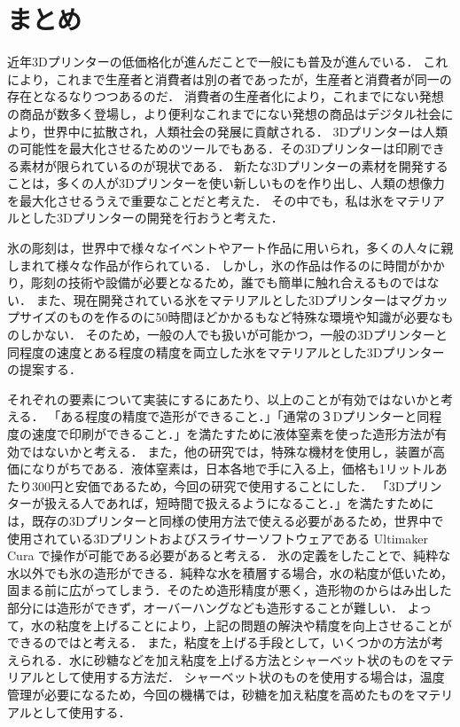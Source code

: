 \chapter{まとめ}
\label{chp:first}

近年3Dプリンターの低価格化が進んだことで一般にも普及が進んでいる．
これにより，これまで生産者と消費者は別の者であったが，生産者と消費者が同一の存在となるなりつつあるのだ．
消費者の生産者化により，これまでにない発想の商品が数多く登場し，より便利なこれまでにない発想の商品はデジタル社会により，世界中に拡散され，人類社会の発展に貢献される．
3Dプリンターは人類の可能性を最大化させるためのツールでもある．その3Dプリンターは印刷できる素材が限られているのが現状である．
新たな3Dプリンターの素材を開発することは，多くの人が3Dプリンターを使い新しいものを作り出し、人類の想像力を最大化させるうえで重要なことだと考えた．
その中でも，私は氷をマテリアルとした3Dプリンターの開発を行おうと考えた．

氷の彫刻は，世界中で様々なイベントやアート作品に用いられ，多くの人々に親しまれて様々な作品が作られている．
しかし，氷の作品は作るのに時間がかかり，彫刻の技術や設備が必要となるため，誰でも簡単に触れ合えるものではない．
また、現在開発されている氷をマテリアルとした3Dプリンターはマグカップサイズのものを作るのに50時間ほどかかるもなど特殊な環境や知識が必要なものしかない．
そのため，一般の人でも扱いが可能かつ，一般の3Dプリンターと同程度の速度とある程度の精度を両立した氷をマテリアルとした3Dプリンターの提案する．



それぞれの要素について実装にするにあたり、以上のことが有効ではないかと考える．
「ある程度の精度で造形ができること．」「通常の３Dプリンターと同程度の速度で印刷ができること．」を満たすために液体窒素を使った造形方法が有効ではないかと考える．
また，他の研究では，特殊な機材を使用し，装置が高価になりがちである．液体窒素は，日本各地で手に入る上，価格も1リットルあたり300円と安価であるため，今回の研究で使用することにした．
「3Dプリンターが扱える人であれば，短時間で扱えるようになること．」を満たすためには，既存の3Dプリンターと同様の使用方法で使える必要があるため，世界中で使用されている3Dプリントおよびスライサーソフトウェアである Ultimaker Cura で操作が可能である必要があると考える．
氷の定義をしたことで、純粋な水以外でも氷の造形ができる．純粋な水を積層する場合，水の粘度が低いため，固まる前に広がってしまう．そのため造形精度が悪く，造形物のからはみ出した部分には造形ができず，オーバーハングなども造形することが難しい．
よって，水の粘度を上げることにより，上記の問題の解決や精度を向上させることができるのではと考える．
また，粘度を上げる手段として，いくつかの方法が考えられる．水に砂糖などを加え粘度を上げる方法とシャーベット状のものをマテリアルとして使用する方法だ．
シャーベット状のものを使用する場合は，温度管理が必要になるため，今回の機構では，砂糖を加え粘度を高めたものをマテリアルとして使用する．







